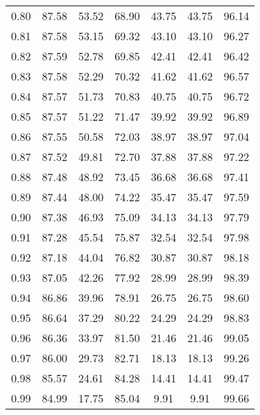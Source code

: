 \begin{tabular}{|c|c|c|c|c|c|c|}
      0.80 &     87.58 &     53.52 &      68.90 &   43.75 &      43.75 &         96.14 \\
      0.81 &     87.58 &     53.15 &      69.32 &   43.10 &      43.10 &         96.27 \\
      0.82 &     87.59 &     52.78 &      69.85 &   42.41 &      42.41 &         96.42 \\
      0.83 &     87.58 &     52.29 &      70.32 &   41.62 &      41.62 &         96.57 \\
      0.84 &     87.57 &     51.73 &      70.83 &   40.75 &      40.75 &         96.72 \\
      0.85 &     87.57 &     51.22 &      71.47 &   39.92 &      39.92 &         96.89 \\
      0.86 &     87.55 &     50.58 &      72.03 &   38.97 &      38.97 &         97.04 \\
      0.87 &     87.52 &     49.81 &      72.70 &   37.88 &      37.88 &         97.22 \\
      0.88 &     87.48 &     48.92 &      73.45 &   36.68 &      36.68 &         97.41 \\
      0.89 &     87.44 &     48.00 &      74.22 &   35.47 &      35.47 &         97.59 \\
      0.90 &     87.38 &     46.93 &      75.09 &   34.13 &      34.13 &         97.79 \\
      0.91 &     87.28 &     45.54 &      75.87 &   32.54 &      32.54 &         97.98 \\
      0.92 &     87.18 &     44.04 &      76.82 &   30.87 &      30.87 &         98.18 \\
      0.93 &     87.05 &     42.26 &      77.92 &   28.99 &      28.99 &         98.39 \\
      0.94 &     86.86 &     39.96 &      78.91 &   26.75 &      26.75 &         98.60 \\
      0.95 &     86.64 &     37.29 &      80.22 &   24.29 &      24.29 &         98.83 \\
      0.96 &     86.36 &     33.97 &      81.50 &   21.46 &      21.46 &         99.05 \\
      0.97 &     86.00 &     29.73 &      82.71 &   18.13 &      18.13 &         99.26 \\
      0.98 &     85.57 &     24.61 &      84.28 &   14.41 &      14.41 &         99.47 \\
      0.99 &     84.99 &     17.75 &      85.04 &    9.91 &       9.91 &         99.66 \\
\bottomrule
\end{tabular}
